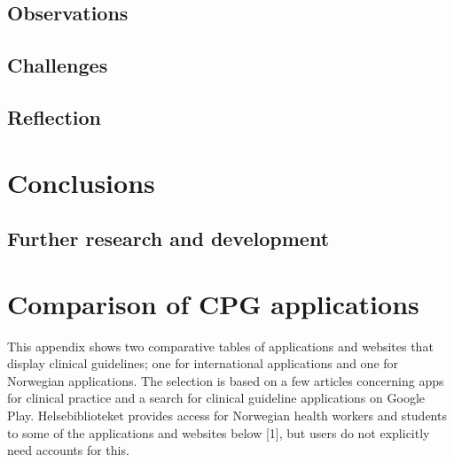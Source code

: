 \documentclass[a4paper,12pt]{book}
\begin{document}
\section{Observations}
\section{Challenges}
\section{Reflection}



\chapter{Conclusions}
\section{Further research and development}


\backmatter
\printbibliography


\appendix
\chapter{Comparison of CPG applications}\label{appendix:ComparisonApps}
This appendix shows two comparative tables of applications and websites that display clinical guidelines; one for international applications and one for Norwegian applications. The selection is based on a few articles concerning apps for clinical practice and a search for clinical guideline applications on Google Play.
Helsebiblioteket provides access for Norwegian health workers and students to some of the applications and websites below [1], but users do not explicitly need accounts for this.

\end{document}
